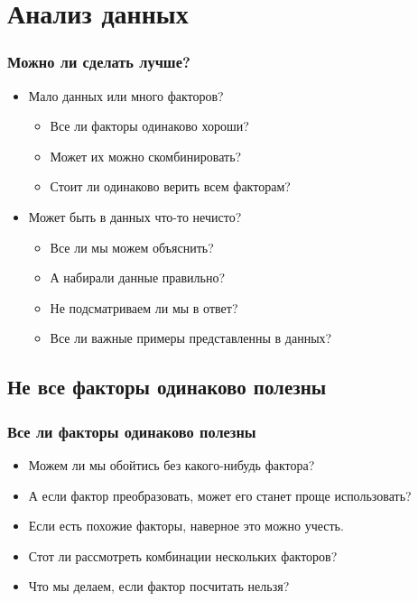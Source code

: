 \documentclass[14pt, fleqn, xcolor={dvipsnames, table}]{beamer}
\begin{document}
\section{Анализ данных}
\begin{frame}[t]\frametitle{Можно ли сделать лучше?}
\begin{itemize}
  \item Мало данных или много факторов?
  \begin{itemize}
    \item Все ли факторы одинаково хороши?
    \item Может их можно скомбинировать?
    \item Стоит ли одинаково верить всем факторам?
  \end{itemize}
  \item Может быть в данных что-то нечисто?
  \begin{itemize}
    \item Все ли мы можем объяснить?
    \item А набирали данные правильно?
    \item Не подсматриваем ли мы в ответ?
    \item Все ли важные примеры представленны в данных?
  \end{itemize}
\end{itemize}
\end{frame}

\subsection{Не все факторы одинаково полезны}
\begin{frame}[t]\frametitle{Все ли факторы одинаково полезны}
\begin{itemize}
  \item Можем ли мы обойтись без какого-нибудь фактора?
  \item А если фактор преобразовать, может его станет проще использовать?
  \item Если есть похожие факторы, наверное это можно учесть.
  \item Стот ли рассмотреть комбинации нескольких факторов?
  \item Что мы делаем, если фактор посчитать нельзя?
\end{itemize}
\end{frame}
\end{document}
